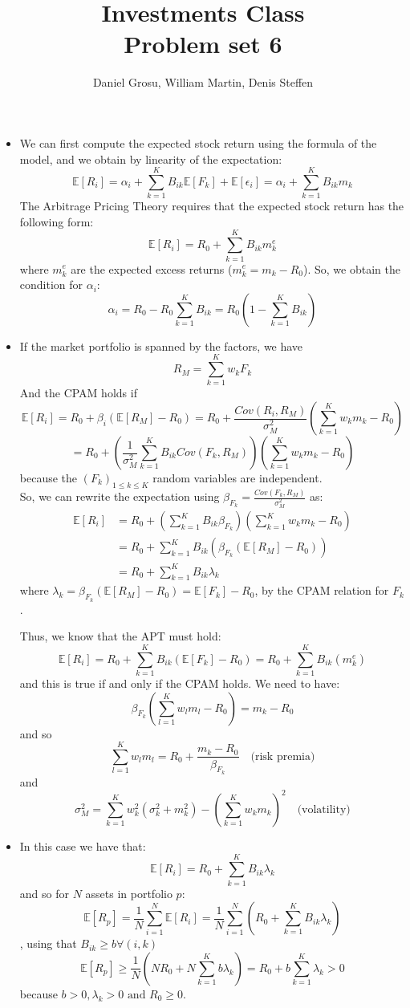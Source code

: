 \documentclass[10pt]{article}
\newcommand{\Ebb}{\mathbb{E}}
\newenvironment{exercise}[2][Exercise]{\begin{trivlist}
  \item[\hskip \labelsep {\bfseries #1}\hskip \labelsep {\bfseries #2.}]}{\end{trivlist}}
\begin{document}
	
  \renewcommand{\qedsymbol}{\smiley}
	\title{Investments Class \\ Problem set 6}
	\author{Daniel Grosu, William Martin, Denis Steffen}
		
\maketitle

\begin{exercise}{1}
  \begin{itemize}
    \item We can first compute the expected stock return using the formula of the model, and we obtain by linearity of the expectation: 
     $$ \Ebb[R_i] = \alpha_i + \sum_{k=1}^K B_{ik}\Ebb[F_k] + \Ebb[\epsilon_i] = \alpha_i + \sum_{k=1}^K B_{ik}m_k $$
     The Arbitrage Pricing Theory requires that the expected stock return has the following form: $$ \Ebb[R_i] = R_0 + \sum_{k=1}^K B_{ik}m_k^e$$ where $m_k^e$ are the expected excess returns ($m_k^e = m_k - R_0$). 
     So, we obtain the condition for $\alpha_i$: 
     $$ \alpha_i = R_0 - R_0\sum_{k=1}^K B_{ik} = R_0(1-\sum_{k=1}^KB_{ik})$$
    \item If the market portfolio is spanned by the factors, we have $$ R_M = \sum_{k=1}^Kw_kF_k$$ And the CPAM holds if $$ \Ebb[R_i] = R_0 + \beta_i(\Ebb[R_M]-R_0) = R_0 + \frac{Cov(R_i,R_M)}{\sigma_M^2}(\sum_{k=1}^Kw_km_k-R_0)$$
    $$ = R_0 + \left(\frac{1}{\sigma_M^2}\sum_{k=1}^KB_{ik}Cov(F_k,R_M)\right)(\sum_{k=1}^Kw_km_k-R_0)$$ because the $(F_k)_{1\leq k\leq K}$ random variables are independent.
    \\
    So, we can rewrite the expectation using $\beta_{F_k} = \frac{Cov(F_k,R_M)}{\sigma_M^2}$ as: 
    \begin{align*}
      \Ebb[R_i] &= R_0 + \left(\sum_{k=1}^K B_{ik}\beta_{F_k}\right)\left(\sum_{k=1}^Kw_km_k-R_0\right) \\
      &= R_0 + \sum_{k=1}^K B_{ik}(\beta_{F_k}(\Ebb[R_M]-R_0)) \\
      &= R_0 + \sum_{k=1}^K B_{ik}\lambda_k
    \end{align*} where $ \lambda_k = \beta_{F_k}(\Ebb[R_M]-R_0) = \Ebb[F_k] - R_0$, by the CPAM relation for $F_k$.

    Thus, we know that the APT must hold: 
    $$ \Ebb[R_i] = R_0 + \sum_{k=1}^K B_{ik}(\Ebb[F_k] - R_0) = R_0 + \sum_{k=1}^K B_{ik}(m_k^e)$$ and this is true if and only if the CPAM holds.
    We need to have: $$ \beta_{F_k}(\sum_{l=1}^K w_lm_l - R_0) = m_k - R_0$$ and so $$ \sum_{l=1}^K w_lm_l = R_0 + \frac{m_k-R_0}{\beta_{F_k}}\quad \text{(risk premia)}$$
    and $$ \sigma_M^2 = \sum_{k=1}^K w_k^2(\sigma_k^2 + m_k^2)-(\sum_{k=1}^Kw_km_k)^2 \quad \text{(volatility)}$$
    \item In this case we have that: 
    $$ \Ebb[R_i] = R_0 + \sum_{k=1}^K B_{ik}\lambda_k$$ and so for $N$ assets in portfolio $p$:
    $$ \Ebb[R_p] = \frac{1}{N}\sum_{i=1}^N\Ebb[R_i] = \frac{1}{N}\sum_{i=1}^N(R_0 + \sum_{k=1}^K B_{ik}\lambda_k)$$, using that $B_{ik}\geq b \forall (i,k)$
    $$ \Ebb[R_p] \geq \frac{1}{N}\left(NR_0 + N\sum_{k=1}^K b\lambda_k\right) = R_0 + b\sum_{k=1}^K\lambda_k > 0 $$ because $b> 0, \lambda_k >0 \text{ and } R_0 \geq 0$.


\end{itemize}
\end{exercise}
\end{document}

